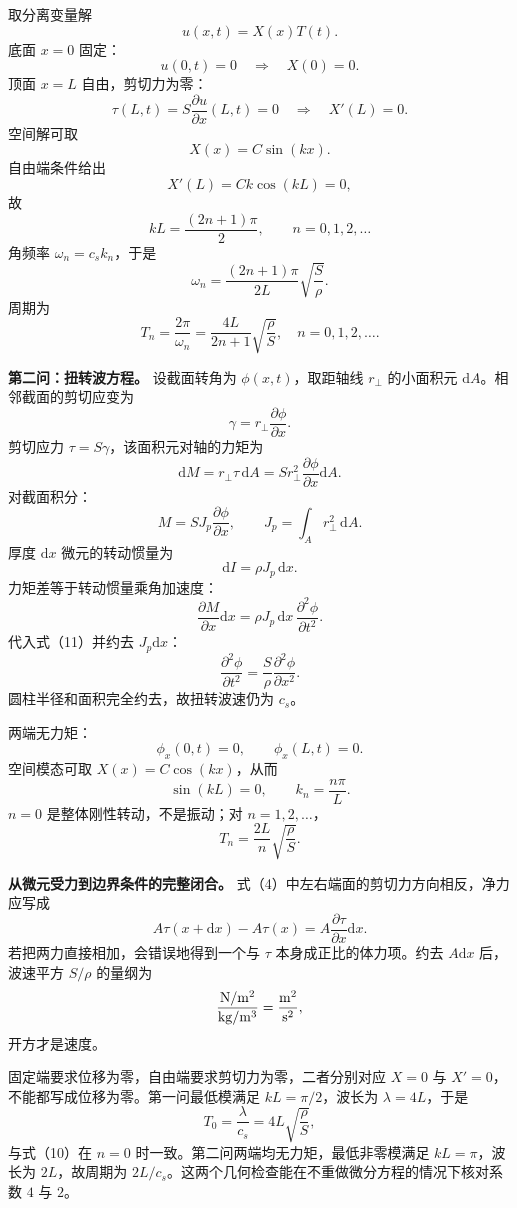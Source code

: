 \documentclass[12pt,a4paper,UTF8]{ctexart}
\begin{document}
取分离变量解 \[
u(x,t)=X(x)T(t).
\] 底面 \(x=0\) 固定： \[
u(0,t)=0\quad\Rightarrow\quad X(0)=0.
\] 顶面 \(x=L\) 自由，剪切力为零： \[
\tau(L,t)=S\frac{\partial u}{\partial x}(L,t)=0
\quad\Rightarrow\quad X'(L)=0. \tag{8}
\] 空间解可取 \[
X(x)=C\sin(kx).
\] 自由端条件给出 \[
X'(L)=Ck\cos(kL)=0,
\] 故 \[
kL=\frac{(2n+1)\pi}{2},\qquad n=0,1,2,\ldots \tag{9}
\] 角频率 \(\omega_n=c_sk_n\)，于是 \[
\omega_n=\frac{(2n+1)\pi}{2L}\sqrt{\frac S\rho}.
\] 周期为 \[
\boxed{
T_n=\frac{2\pi}{\omega_n}
=\frac{4L}{2n+1}\sqrt{\frac\rho S},
\quad n=0,1,2,\ldots
}. \tag{10}
\]

\textbf{第二问：扭转波方程。} 设截面转角为 \(\phi(x,t)\)，取距轴线
\(r_\perp\) 的小面积元 \(\mathrm dA\)。相邻截面的剪切应变为 \[
\gamma=r_\perp\frac{\partial\phi}{\partial x}.
\] 剪切应力 \(\tau=S\gamma\)，该面积元对轴的力矩为 \[
\mathrm dM=r_\perp\tau\,\mathrm dA
=S r_\perp^2\frac{\partial\phi}{\partial x}\mathrm dA.
\] 对截面积分： \[
M=S J_p\frac{\partial\phi}{\partial x},\qquad
J_p=\int_A r_\perp^2\,\mathrm dA. \tag{11}
\] 厚度 \(\mathrm dx\) 微元的转动惯量为 \[
\mathrm dI=\rho J_p\,\mathrm dx. \tag{12}
\] 力矩差等于转动惯量乘角加速度： \[
\frac{\partial M}{\partial x}\mathrm dx
=\rho J_p\,\mathrm dx\,
\frac{\partial^2\phi}{\partial t^2}.
\] 代入式（11）并约去 \(J_p\mathrm dx\)： \[
\frac{\partial^2\phi}{\partial t^2}
=\frac S\rho\frac{\partial^2\phi}{\partial x^2}. \tag{13}
\] 圆柱半径和面积完全约去，故扭转波速仍为 \(c_s\)。

两端无力矩： \[
\phi_x(0,t)=0,\qquad \phi_x(L,t)=0.
\] 空间模态可取 \(X(x)=C\cos(kx)\)，从而 \[
\sin(kL)=0,\qquad k_n=\frac{n\pi}{L}.
\] \(n=0\) 是整体刚性转动，不是振动；对 \(n=1,2,\ldots\)， \[
\boxed{
T_n=\frac{2L}{n}\sqrt{\frac\rho S}
}. \tag{14}
\]

\textbf{从微元受力到边界条件的完整闭合。}
式（4）中左右端面的剪切力方向相反，净力应写成 \[
A\tau(x+\mathrm dx)-A\tau(x)
=A\frac{\partial\tau}{\partial x}\mathrm dx.
\] 若把两力直接相加，会错误地得到一个与 \(\tau\)
本身成正比的体力项。约去 \(A\mathrm dx\) 后，波速平方 \(S/\rho\)
的量纲为 \[
\frac{{\rm N/m^2}}{{\rm kg/m^3}}
=\frac{{\rm m^2}}{{\rm s^2}},
\] 开方才是速度。

固定端要求位移为零，自由端要求剪切力为零，二者分别对应 \(X=0\) 与
\(X'=0\)，不能都写成位移为零。第一问最低模满足 \(kL=\pi/2\)，波长为
\(\lambda=4L\)，于是 \[
T_0=\frac{\lambda}{c_s}=4L\sqrt{\frac\rho S},
\] 与式（10）在 \(n=0\) 时一致。第二问两端均无力矩，最低非零模满足
\(kL=\pi\)，波长为 \(2L\)，故周期为
\(2L/c_s\)。这两个几何检查能在不重做微分方程的情况下核对系数 \(4\) 与
\(2\)。
\end{document}
